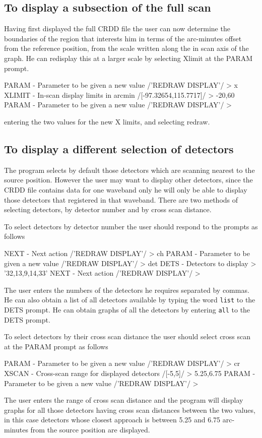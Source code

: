 \documentclass[twoside,11pt]{starlink}
\begin{document}
\subsection{To display a subsection of the full scan}
Having first displayed the full CRDD file the user can now determine the
boundaries of the region that interests him in terms of the arc-minutes offset
from the reference position, from the scale written along the in scan axis of
the graph. He can redisplay this at a larger scale by selecting Xlimit at the
PARAM prompt.
\begin{small}
\begin{terminalv}
PARAM - Parameter to be given a new value /'REDRAW DISPLAY'/ > x
XLIMIT - In-scan display limits in arcmin /[-97.32654,115.7717]/ > -20,60
PARAM - Parameter to be given a new value /'REDRAW DISPLAY'/ >
\end{terminalv}
\end{small}
entering the two values for the new X limits, and selecting redraw.
\subsection{To display a different selection of detectors}
The program selects by default those detectors which are scanning nearest to
the source position. However the user may want to display other detectors,
since the CRDD file contains data for one waveband only he will only be able
to display those detectors that registered in that waveband. There are two
methods of selecting detectors, by detector number and by cross scan distance.

To select detectors by detector number the user should respond to the prompts
as follows
\begin{small}
\begin{terminalv}
NEXT - Next action /'REDRAW DISPLAY'/ > ch
PARAM - Parameter to be given a new value /'REDRAW DISPLAY'/ > det
DETS - Detectors to display > '32,13,9,14,33'
NEXT - Next action /'REDRAW DISPLAY'/ >
\end{terminalv}
\end{small}
The user enters the numbers of the detectors he requires separated by commas.
He can also obtain a list of all detectors available by typing the word \texttt{list} to the DETS prompt. He can obtain graphs of all the detectors by entering
\texttt{all} to the DETS prompt.

To select detectors by their cross scan distance the user should select cross
scan at the PARAM prompt as follows
\begin{small}
\begin{terminalv}
PARAM - Parameter to be given a new value /'REDRAW DISPLAY'/ > cr
XSCAN - Cross-scan range for displayed detectors /[-5,5]/ > 5.25,6.75
PARAM - Parameter to be given a new value /'REDRAW DISPLAY'/ >
\end{terminalv}
\end{small}
The user enters the range of cross scan distance and the program will display
graphs for all those detectors having cross scan distances between the two
values, in this case detectors whose closest approach is between 5.25 and
6.75 arc-minutes from the source position are displayed.
\end{document}

